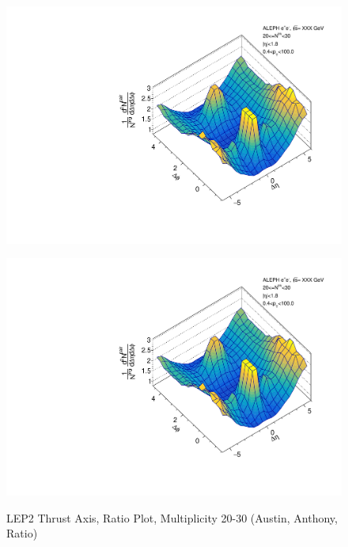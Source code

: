 \begin{figure}[htbp]
  \caption{LEP2 Thrust Axis, Ratio Plot, Multiplicity 20-30 (Austin, Anthony, Ratio)}
  \begin{minipage}[b]{0.32\linewidth}
    \centering
    \includegraphics[width=\linewidth]{images/TwoParticleCorrelation/LEP2_THRUST/LEP2_THRUST_ratio1_20_30.pdf}
    \label{fig:LEP2 Thrust Axis, Ratio Plot, Multiplicity 20-30, Austin}
  \end{minipage}
  \hspace{0.0cm}
  \begin{minipage}[b]{0.32\linewidth}
    \centering
    \includegraphics[width=\linewidth]{images/TwoParticleCorrelation/LEP2_THRUST/LEP2_THRUST_ratio2_20_30.pdf}
    \label{fig:LEP2 Thrust Axis, Ratio Plot, Multiplicity 20-30, Anthony}

\end{minipage}
\end{figure}
